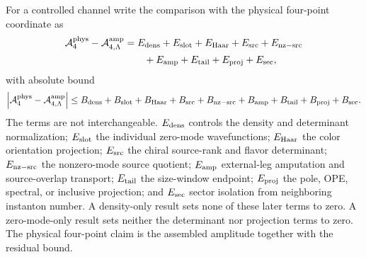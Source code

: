 \begin{controlledapproximation}
For a controlled channel write the comparison with the physical four-point
coordinate as
\begin{equation}
\begin{aligned}
  \mathcal A_{4}^{\rm phys}
  -
  \mathcal A_{4,\Lambda}^{\rm amp}
  &=
  E_{\rm dens}
  +E_{\rm slot}
  +E_{\rm Haar}
  +E_{\rm src}
  +E_{\rm nz-src}                                      \\
  &\qquad
  +E_{\rm amp}
  +E_{\rm tail}
  +E_{\rm proj}
  +E_{\rm sec},
\end{aligned}
  \label{eq:instanton-thooft-four-point-residual}
\end{equation}
with absolute bound
\begin{equation}
  \left|
  \mathcal A_{4}^{\rm phys}
  -
  \mathcal A_{4,\Lambda}^{\rm amp}
  \right|
  \le
  B_{\rm dens}+B_{\rm slot}+B_{\rm Haar}+B_{\rm src}
  +B_{\rm nz-src}+B_{\rm amp}+B_{\rm tail}+B_{\rm proj}+B_{\rm sec}.
  \label{eq:instanton-thooft-four-point-bound}
\end{equation}
The terms are not interchangeable.  \(E_{\rm dens}\) controls the density and
determinant normalization; \(E_{\rm slot}\) the individual zero-mode
wavefunctions; \(E_{\rm Haar}\) the color orientation projection;
\(E_{\rm src}\) the chiral source-rank and flavor determinant;
\(E_{\rm nz-src}\) the nonzero-mode source quotient; \(E_{\rm amp}\) external-leg
amputation and source-overlap transport; \(E_{\rm tail}\) the size-window
endpoint; \(E_{\rm proj}\) the pole, OPE, spectral, or inclusive projection;
and \(E_{\rm sec}\) sector isolation from neighboring instanton number.  A
density-only result sets none of these later terms to zero.  A
zero-mode-only result sets neither the determinant nor projection terms to
zero.  The physical four-point claim is the assembled amplitude together with
the residual bound.
\end{controlledapproximation}


